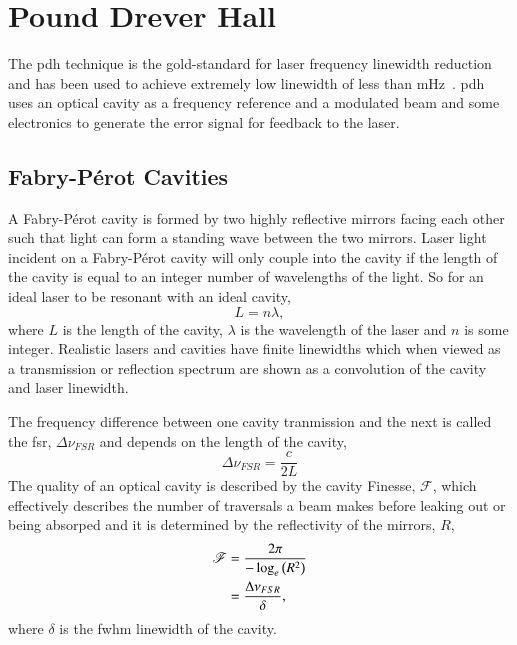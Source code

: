 \section{Pound Drever Hall}

The \gls{pdh} technique is the gold-standard for laser frequency linewidth reduction~\cite{drever_laser_1983} and has been used to achieve extremely low linewidth of less than \unit[40]{mHz}~\cite{kessler_sub-40-mhz-linewidth_2012}.
\Gls{pdh} uses an optical cavity as a frequency reference and a modulated beam and some electronics to generate the error signal for feedback to the laser.

\subsection{Fabry-P\'erot Cavities}{
A Fabry-P\'erot cavity is formed by two highly reflective mirrors facing each other such that light can form a standing wave between the two mirrors.
Laser light incident on a Fabry-P\'erot cavity will only couple into the cavity if the length of the cavity is equal to an integer number of wavelengths of the light.
So for an ideal laser to be resonant with an ideal cavity,
\begin{equation}
L = n \lambda,
\end{equation}
where $L$ is the length of the cavity, $\lambda$ is the wavelength of the laser and $n$ is some integer.
Realistic lasers and cavities have finite linewidths which when viewed as a transmission or reflection spectrum are shown as a convolution of the cavity and laser linewidth.

The frequency difference between one cavity tranmission and the next is called the \gls{fsr}, $\Delta \nu_{FSR}$ and depends on the length of the cavity,
\begin{equation}
\Delta \nu_{FSR} = \frac{c}{2L}
\end{equation}
The quality of an optical cavity is described by the cavity Finesse, $\mathscr{F}$, which effectively describes the number of traversals a beam makes before leaking out or being absorped and it is determined by the reflectivity of the mirrors, $R$,
\begin{align}
\mathscr{F} &= \frac{2\pi}{-\log_e\left(R^2\right)} \notag\\
 &= \frac{\Delta \nu_{FSR}}{\delta},
\end{align}
where $\delta$ is the \gls{fwhm} linewidth of the cavity.

}

